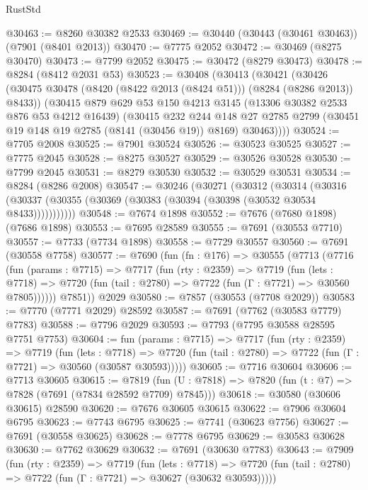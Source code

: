 \begin{lexlean}{RustStd}
\begin{coremodule}
@30463 := @8260 @30382 @2533
@30469 := @30440 (@30443 (@30461 @30463)) (@7901 (@8401 @2013))
@30470 := @7775 @2052
@30472 := @30469 (@8275 @30470)
@30473 := @7799 @2052
@30475 := @30472 (@8279 @30473)
@30478 := @8284 (@8412 @2031 @53)
@30523 := @30408
    (@30413
      (@30421
        (@30426 (@30475 @30478 (@8420 (@8422 @2013 (@8424 @51))) (@8284 (@8286 @2013)) @8433))
        (@30415
          @879
          @629
          @53
          @150
          @4213
          @3145
          (@13306 @30382 @2533 @876 @53 @4212 @16439)
          (@30415
            @232
            @244
            @148
            @27
            @2785
            @2799
            (@30451 @19 @148 @19 @2785 (@8141 (@30456 @19)) @8169)
            @30463))))
@30524 := @7705 @2008
@30525 := @7901 @30524
@30526 := @30523 @30525
@30527 := @7775 @2045
@30528 := @8275 @30527
@30529 := @30526 @30528
@30530 := @7799 @2045
@30531 := @8279 @30530
@30532 := @30529 @30531
@30534 := @8284 (@8286 @2008)
@30547 := @30246
    (@30271
      (@30312
        (@30314
          (@30316 (@30337 (@30355 (@30369 (@30383 (@30394 (@30398 (@30532 @30534 @8433)))))))))))
@30548 := @7674 @1898
@30552 := @7676 (@7680 @1898) (@7686 @1898)
@30553 := @7695 @28589
@30555 := @7691 (@30553 @7710)
@30557 := @7733 (@7734 @1898)
@30558 := @7729 @30557
@30560 := @7691 (@30558 @7758)
@30577 := @7690
    (fun (fn : @176) =>
    @30555
      (@7713
        (@7716
          (fun (params : @7715) =>
          @7717
            (fun (rty : @2359) =>
            @7719
              (fun (lets : @7718) =>
              @7720 (fun (tail : @2780) => @7722 (fun (Γ : @7721) => @30560 @7805))))))
        @7851))
    @2029
@30580 := @7857 (@30553 (@7708 @2029))
@30583 := @7770 (@7771 @2029) @28592
@30587 := @7691 (@7762 (@30583 @7779) @7783)
@30588 := @7796 @2029
@30593 := @7793 (@7795 @30588 @28595 @7751 @7753)
@30604 := fun (params : @7715) =>
  @7717
    (fun (rty : @2359) =>
    @7719
      (fun (lets : @7718) =>
      @7720 (fun (tail : @2780) => @7722 (fun (Γ : @7721) => @30560 (@30587 @30593)))))
@30605 := @7716 @30604
@30606 := @7713 @30605
@30615 := @7819
    (fun (U : @7818) => @7820 (fun (t : @7) => @7828 (@7691 (@7834 @28592 @7709) @7845)))
@30618 := @30580 (@30606 @30615) @28590
@30620 := @7676 @30605 @30615
@30622 := @7906 @30604 @6795
@30623 := @7743 @6795
@30625 := @7741 (@30623 @7756)
@30627 := @7691 (@30558 @30625)
@30628 := @7778 @6795
@30629 := @30583 @30628
@30630 := @7762 @30629
@30632 := @7691 (@30630 @7783)
@30643 := @7909
    (fun (rty : @2359) =>
    @7719
      (fun (lets : @7718) =>
      @7720 (fun (tail : @2780) => @7722 (fun (Γ : @7721) => @30627 (@30632 @30593)))))

\end{coremodule}
\end{lexlean}
